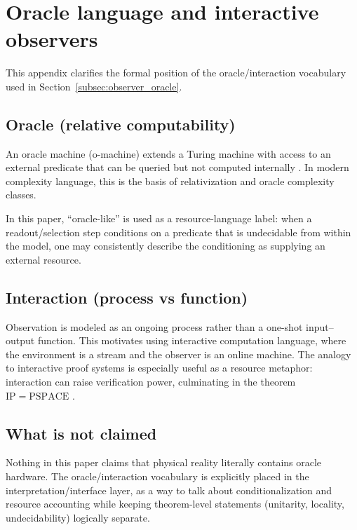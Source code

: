 \section{Oracle language and interactive observers}
\label{app:oracle_itm}

This appendix clarifies the formal position of the oracle/interaction vocabulary used in Section~\ref{subsec:observer_oracle}.

\subsection{Oracle (relative computability)}
An oracle machine (o-machine) extends a Turing machine with access to an external predicate that can be queried but not computed internally \cite{Turing1939}.
In modern complexity language, this is the basis of relativization and oracle complexity classes.

In this paper, ``oracle-like'' is used as a resource-language label: when a readout/selection step conditions on a predicate that is undecidable from within the model, one may consistently describe the conditioning as supplying an external resource.

\subsection{Interaction (process vs function)}
Observation is modeled as an ongoing process rather than a one-shot input--output function.
This motivates using interactive computation language, where the environment is a stream and the observer is an online machine.
The analogy to interactive proof systems is especially useful as a resource metaphor: interaction can raise verification power, culminating in the theorem $\mathrm{IP}=\mathrm{PSPACE}$ \cite{Shamir1992}.

\subsection{What is not claimed}
Nothing in this paper claims that physical reality literally contains oracle hardware.
The oracle/interaction vocabulary is explicitly placed in the interpretation/interface layer, as a way to talk about conditionalization and resource accounting while keeping theorem-level statements (unitarity, locality, undecidability) logically separate.
